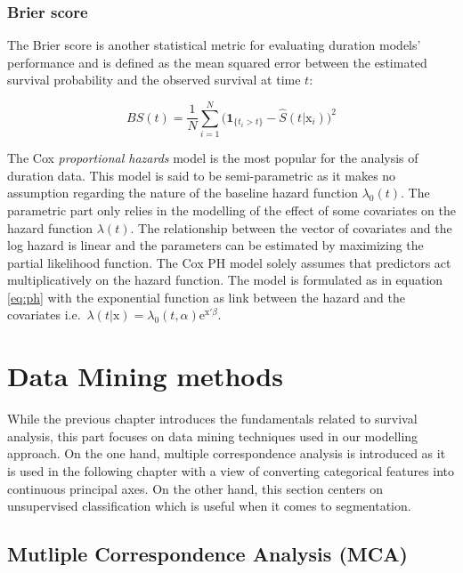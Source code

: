 \documentclass[
]{book}
\begin{document}
\hypertarget{brier-score}{%
\subsection{Brier score}\label{brier-score}}

The Brier score is another statistical metric for evaluating duration models' performance and is defined as the mean squared error between the estimated survival probability and the observed survival at time \(t\):

\begin{equation}
  BS(t) = \frac{1}{N} \sum_{i=1}^{N} \Big(\pmb{1}_{\{t_i>t\}} - \hat{S}(t|\mathrm{x}_i) \Big)^2
  \label{eq:brier}
\end{equation}

The Cox \emph{proportional hazards} model is the most popular for the analysis of duration data. This model is said to be semi-parametric as it makes no assumption regarding the nature of the baseline hazard function \(\lambda_0(t)\). The parametric part only relies in the modelling of the effect of some covariates on the hazard function \(\lambda(t)\). The relationship between the vector of covariates and the log hazard is linear and the parameters can be estimated by maximizing the partial likelihood function. The Cox PH model solely assumes that predictors act multiplicatively on the hazard function. The model is formulated as in equation \eqref{eq:ph} with the exponential function as link between the hazard and the covariates i.e.~\(\lambda(t|\pmb{\mathrm{x}}) = \lambda_0 (t,\alpha) \text{e}^{\pmb{\mathrm{x'}} \beta}\).

\hypertarget{dataMining}{%
\chapter{Data Mining methods}\label{dataMining}}

While the previous chapter introduces the fundamentals related to survival analysis, this part focuses on data mining techniques used in our modelling approach. On the one hand, multiple correspondence analysis is introduced as it is used in the following chapter with a view of converting categorical features into continuous principal axes. On the other hand, this section centers on unsupervised classification which is useful when it comes to segmentation.

\hypertarget{mca}{%
\section{Mutliple Correspondence Analysis (MCA)}\label{mca}}
\end{document}
